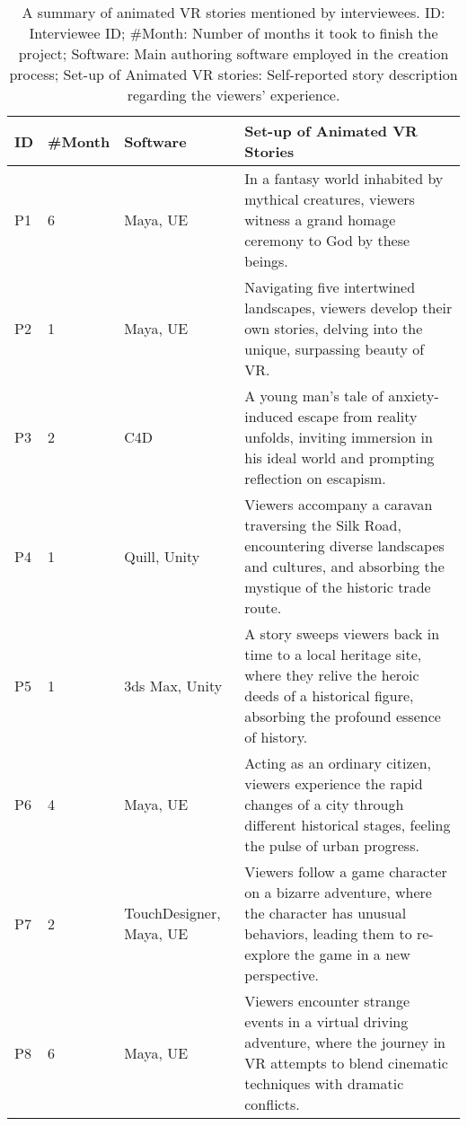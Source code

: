 \renewcommand{\arraystretch}{1.25}
\begin{table*}[ht]
\setlength{\aboverulesep}{0.5pt}
\setlength{\belowrulesep}{0.5pt}
\setlength{\tabcolsep}{8pt}
\caption{A summary of animated VR stories mentioned by interviewees. ID: Interviewee ID; \#Month: Number of months it took to finish the project; Software: Main authoring software employed in the creation process; Set-up of Animated VR stories: Self-reported story description regarding the viewers' experience.}
\label{tab:project_details}
\begin{tabular}{m{0.9cm}m{0.7cm}m{3cm}m{11cm}}
\toprule

\textbf{ID} & \textbf{\#Month} & \textbf{Software} & \textbf{Set-up of Animated VR Stories} \\ 
\midrule
P1 & 6 & Maya, UE & In a fantasy world inhabited by mythical creatures, viewers witness a grand homage ceremony to God by these beings. \\
\arrayrulecolor{lighttablerowcolor}\cline{1-4}
P2 & 1 & Maya, UE & Navigating five intertwined landscapes, viewers develop their own stories, delving into the unique, surpassing beauty of VR. \\
\cline{1-4}
P3 & 2 & C4D & A young man's tale of anxiety-induced escape from reality unfolds, inviting immersion in his ideal world and prompting reflection on escapism. \\
\cline{1-4}
P4 & 1 & Quill, Unity & Viewers accompany a caravan traversing the Silk Road, encountering diverse landscapes and cultures, and absorbing the mystique of the historic trade route. \\
\cline{1-4}
P5 & 1 & 3ds Max, Unity & A story sweeps viewers back in time to a local heritage site, where they relive the heroic deeds of a historical figure, absorbing the profound essence of history.\\
\cline{1-4}
P6 & 4 & Maya, UE & Acting as an ordinary citizen, viewers experience the rapid changes of a city through different historical stages, feeling the pulse of urban progress. \\
\cline{1-4}
P7 & 2 & TouchDesigner, Maya, UE & Viewers follow a game character on a bizarre adventure, where the character has unusual behaviors, leading them to re-explore the game in a new perspective. \\
\cline{1-4}
P8 & 6 & Maya, UE & Viewers encounter strange events in a virtual driving adventure, where the journey in VR attempts to blend cinematic techniques with dramatic conflicts. \\

\end{tabular}
\end{table*}

